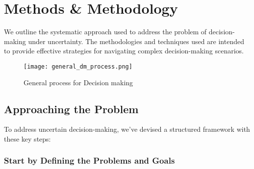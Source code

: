 \documentclass[a4paper,12pt]{report}
\begin{document}

\chapter{Methods \& Methodology}
We outline the systematic approach used to address the problem of decision-making under uncertainty. The methodologies and techniques used are intended to provide effective strategies for navigating complex decision-making scenarios.

\begin{figure}[h!]
  \texttt{[image: general\_dm\_process.png]}
  \caption{General process for Decision making \cite{lunenburg2010decision}}
\end{figure}

\section{Approaching the Problem}
To address uncertain decision-making, we've devised a structured framework with these key steps:
\subsection{Start by Defining the Problems and Goals}
\end{document}
